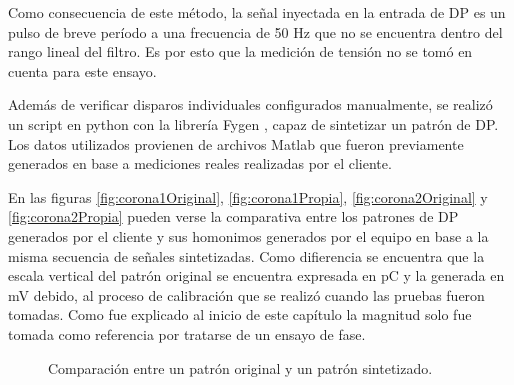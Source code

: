 Como consecuencia de este método, la señal inyectada en la entrada de DP es un pulso de breve período a una frecuencia de 50 Hz que no se encuentra dentro del rango lineal del filtro. Es por esto que la medición de tensión no se tomó en cuenta para este ensayo.

Además de verificar disparos individuales configurados manualmente, se realizó un script en python con la librería Fygen \citep{fygenWeb:1}, capaz de sintetizar un patrón de DP. Los datos utilizados provienen de archivos Matlab que fueron previamente generados en base a mediciones reales realizadas por el cliente.

En las figuras \ref{fig:corona1Original}, \ref{fig:corona1Propia}, \ref{fig:corona2Original} y \ref{fig:corona2Propia} pueden verse la comparativa entre los patrones de DP generados por el cliente y sus homonimos generados por el equipo en base a la misma secuencia de señales sintetizadas. Como difierencia se encuentra que la escala vertical del patrón original se encuentra expresada en pC y la generada en mV debido, al proceso de calibración que se realizó cuando las pruebas fueron tomadas. Como fue explicado al inicio de este capítulo la magnitud solo fue tomada como referencia por tratarse de un ensayo de fase.

\vspace{10mm}

\begin{figure}[htp] 
    \centering
    \hfill%
    \caption{Comparación entre un patrón original y un patrón sintetizado.}
\end{figure}

